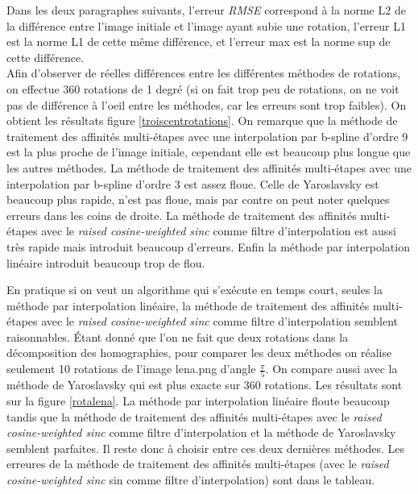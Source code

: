 	Dans les deux paragraphes suivants, l'erreur \emph{RMSE} correspond à la norme L2 de la différence entre l'image initiale et l'image ayant subie une rotation, l'erreur L1 est la norme L1 de cette même différence, et l'erreur max est la norme sup de cette différence.\\

	Afin d'observer de réelles différences entre les différentes méthodes de rotations, on effectue 360 rotations de 1 degré (si on fait trop peu de rotations, on ne voit pas de différence à l'oeil entre les méthodes, car les erreurs sont trop faibles). On obtient les résultats figure  \ref{troiscentrotations}.  On remarque que la méthode de traitement des affinités multi-étapes avec une interpolation par b-spline d'ordre 9 est la plus proche de l'image initiale, cependant elle est beaucoup plus longue que les autres méthodes.  La méthode de traitement des affinités multi-étapes avec une interpolation par b-spline d'ordre 3 est assez floue. Celle de Yaroslavsky est beaucoup plus rapide, n'est pas floue, mais par contre on peut noter quelques erreurs dans les coins de droite. La méthode de traitement des affinités multi-étapes avec le \emph{raised cosine-weighted sinc} comme filtre d'interpolation est aussi très rapide mais introduit beaucoup d'erreurs. Enfin la méthode par interpolation linéaire introduit beaucoup trop de flou.\\
\label{pleinsderotations}

	En pratique si on veut un algorithme qui s'exécute en temps court, seules la méthode par interpolation linéaire, la méthode de traitement des affinités multi-étapes avec le \emph{raised cosine-weighted sinc} comme filtre d'interpolation semblent raisonnables. Étant donné que l'on ne fait que deux rotations dans la décomposition des homographies, pour comparer les deux méthodes on réalise seulement 10 rotations de l'image lena.png d'angle $\frac{\pi}{5}$. On compare aussi avec la méthode de Yaroslavsky qui est plus exacte sur 360 rotations. Les résultats sont sur la figure \ref{rotalena}. La méthode par interpolation linéaire floute beaucoup tandis que la méthode de traitement des affinités multi-étapes avec le \emph{raised cosine-weighted sinc} comme filtre d'interpolation et la méthode de Yaroslavsky semblent parfaites. Il reste donc à choisir entre ces deux dernières méthodes. Les erreures de la méthode de traitement des affinités multi-étapes (avec le \emph{raised cosine-weighted sinc} sin comme filtre d'interpolation) sont dans le tableau.  \\

